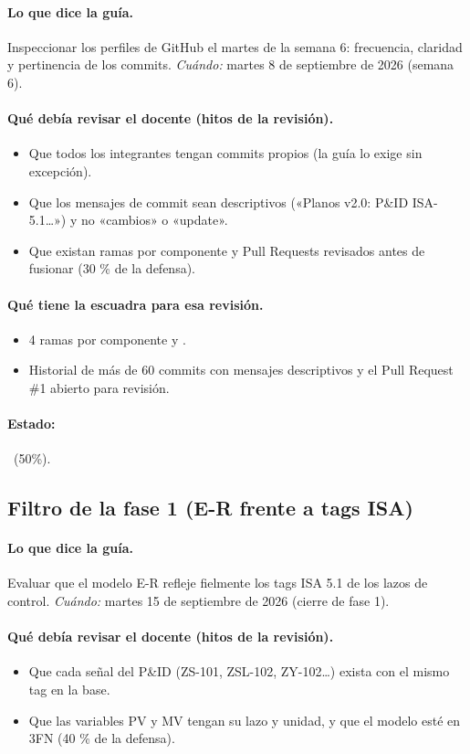 \documentclass[a4paper,11pt]{article}
\begin{document}
\paragraph{Lo que dice la guía.} Inspeccionar los perfiles de GitHub el martes de la semana 6: frecuencia, claridad y pertinencia de los commits. \textit{Cuándo:} martes 8 de septiembre de 2026 (semana 6).
\paragraph{Qué debía revisar el docente (hitos de la revisión).}
\begin{itemize}
\item[$\square$] Que todos los integrantes tengan commits propios (la guía lo exige sin excepción).
\item[$\square$] Que los mensajes de commit sean descriptivos («Planos v2.0: P\&ID ISA-5.1…») y no «cambios» o «update».
\item[$\square$] Que existan ramas por componente y Pull Requests revisados antes de fusionar (30 \% de la defensa).
\end{itemize}
\paragraph{Qué tiene la escuadra para esa revisión.}
\begin{itemize}
\item 4 ramas por componente y .
\item Historial de más de 60 commits con mensajes descriptivos y el Pull Request \#1 abierto para revisión.
\end{itemize}
\paragraph{Estado:} \parcial~(50\%).
\subsection{Filtro de la fase 1 (E-R frente a tags ISA)}
\paragraph{Lo que dice la guía.} Evaluar que el modelo E-R refleje fielmente los tags ISA 5.1 de los lazos de control. \textit{Cuándo:} martes 15 de septiembre de 2026 (cierre de fase 1).
\paragraph{Qué debía revisar el docente (hitos de la revisión).}
\begin{itemize}
\item[$\square$] Que cada señal del P\&ID (ZS-101, ZSL-102, ZY-102…) exista con el mismo tag en la base.
\item[$\square$] Que las variables PV y MV tengan su lazo y unidad, y que el modelo esté en 3FN (40 \% de la defensa).
\end{itemize}
\end{document}
